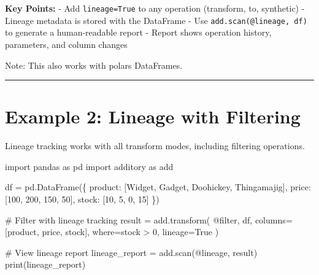 \documentclass[
  letterpaper,
]{scrbook}
\newenvironment{Shaded}{\begin{snugshade}}{\end{snugshade}}
\newcommand{\BuiltInTok}[1]{\textcolor[rgb]{0.00,0.23,0.31}{#1}}
\newcommand{\CommentTok}[1]{\textcolor[rgb]{0.37,0.37,0.37}{#1}}
\newcommand{\DecValTok}[1]{\textcolor[rgb]{0.68,0.00,0.00}{#1}}
\newcommand{\ImportTok}[1]{\textcolor[rgb]{0.00,0.46,0.62}{#1}}
\newcommand{\NormalTok}[1]{\textcolor[rgb]{0.00,0.23,0.31}{#1}}
\newcommand{\OperatorTok}[1]{\textcolor[rgb]{0.37,0.37,0.37}{#1}}
\newcommand{\StringTok}[1]{\textcolor[rgb]{0.13,0.47,0.30}{#1}}
\newcommand{\VariableTok}[1]{\textcolor[rgb]{0.07,0.07,0.07}{#1}}
\begin{document}
\textbf{Key Points:} - Add \texttt{lineage=True} to any operation
(transform, to, synthetic) - Lineage metadata is stored with the
DataFrame - Use
\texttt{add.scan(\textquotesingle{}@lineage\textquotesingle{},\ df)} to
generate a human-readable report - Report shows operation history,
parameters, and column changes

Note: This also works with polars DataFrames.

\begin{center}\rule{0.5\linewidth}{0.5pt}\end{center}

\section{Example 2: Lineage with
Filtering}\label{example-2-lineage-with-filtering}

Lineage tracking works with all transform modes, including filtering
operations.

\begin{Shaded}
\begin{Highlighting}[]
\ImportTok{import}\NormalTok{ pandas }\ImportTok{as}\NormalTok{ pd}
\ImportTok{import}\NormalTok{ additory }\ImportTok{as}\NormalTok{ add}

\NormalTok{df }\OperatorTok{=}\NormalTok{ pd.DataFrame(\{}
    \StringTok{\textquotesingle{}product\textquotesingle{}}\NormalTok{: [}\StringTok{\textquotesingle{}Widget\textquotesingle{}}\NormalTok{, }\StringTok{\textquotesingle{}Gadget\textquotesingle{}}\NormalTok{, }\StringTok{\textquotesingle{}Doohickey\textquotesingle{}}\NormalTok{, }\StringTok{\textquotesingle{}Thingamajig\textquotesingle{}}\NormalTok{],}
    \StringTok{\textquotesingle{}price\textquotesingle{}}\NormalTok{: [}\DecValTok{100}\NormalTok{, }\DecValTok{200}\NormalTok{, }\DecValTok{150}\NormalTok{, }\DecValTok{50}\NormalTok{],}
    \StringTok{\textquotesingle{}stock\textquotesingle{}}\NormalTok{: [}\DecValTok{10}\NormalTok{, }\DecValTok{5}\NormalTok{, }\DecValTok{0}\NormalTok{, }\DecValTok{15}\NormalTok{]}
\NormalTok{\})}

\CommentTok{\# Filter with lineage tracking}
\NormalTok{result }\OperatorTok{=}\NormalTok{ add.transform(}
    \StringTok{\textquotesingle{}@filter\textquotesingle{}}\NormalTok{,}
\NormalTok{    df,}
\NormalTok{    columns}\OperatorTok{=}\NormalTok{[}\StringTok{\textquotesingle{}product\textquotesingle{}}\NormalTok{, }\StringTok{\textquotesingle{}price\textquotesingle{}}\NormalTok{, }\StringTok{\textquotesingle{}stock\textquotesingle{}}\NormalTok{],}
\NormalTok{    where}\OperatorTok{=}\StringTok{\textquotesingle{}stock \textgreater{} 0\textquotesingle{}}\NormalTok{,}
\NormalTok{    lineage}\OperatorTok{=}\VariableTok{True}
\NormalTok{)}

\CommentTok{\# View lineage report}
\NormalTok{lineage\_report }\OperatorTok{=}\NormalTok{ add.scan(}\StringTok{\textquotesingle{}@lineage\textquotesingle{}}\NormalTok{, result)}
\BuiltInTok{print}\NormalTok{(lineage\_report)}
\end{Highlighting}
\end{Shaded}
\end{document}
